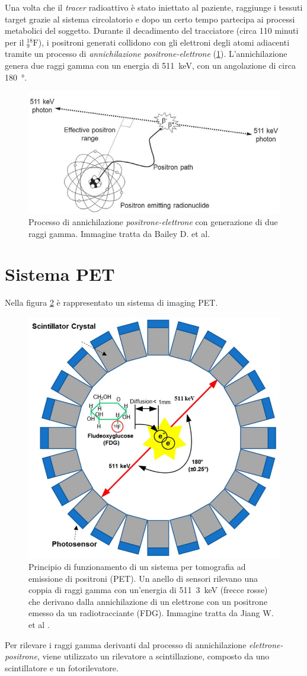 Una volta che il \textit{tracer} radioattivo è stato iniettato al paziente, raggiunge i tessuti target grazie al sistema circolatorio e dopo un certo tempo partecipa ai processi metabolici del soggetto. Durante il decadimento del tracciatore (circa 110 minuti per il $^{18}_9\text{F}$), i positroni generati collidono con gli elettroni degli atomi adiacenti tramite un processo di \textit{annichilazione positrone-elettrone} (\Fig\ref{fig:annihilation}). L'annichilazione genera due raggi gamma con un energia di \SI{511}{\kilo\electronvolt}, con un angolazione di circa \SI{180}{\degree}.
\begin{figure}[h]
	\centering
	\includegraphics[width=0.8\linewidth]{./ImageFiles/annihilation}
	\caption{Processo di annichilazione \textit{positrone-elettrone} con generazione di due raggi gamma. Immagine tratta da Bailey D. et al\cite{Bailey2014}.}
	\label{fig:annihilation}
\end{figure}

\section{Sistema PET}
Nella figura \ref{fig:PET_imaging_system} è rappresentato un sistema di imaging PET. 
\begin{figure}[h]
	\centering
	\includegraphics[width=0.5\linewidth]{./ImageFiles/PET_imaging_system}
	\caption{Principio di funzionamento di un sistema per tomografia ad emissione di positroni (PET). Un anello di sensori rilevano una coppia di raggi gamma con un'energia di \SI{511}{3\kilo\electronvolt} (frecce rosse) che derivano dalla annichilazione di un elettrone con un positrone emesso da un radiotracciante (FDG). Immagine tratta da Jiang W. et al \cite{Jiang2019}.}
	\label{fig:PET_imaging_system}
\end{figure}
Per rilevare i raggi gamma derivanti dal processo di annichilazione \textit{elettrone-positrone}, viene utilizzato un rilevatore a scintillazione, composto da uno scintillatore e un fotorilevatore. 

